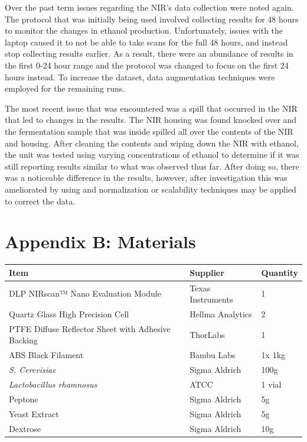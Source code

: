 \documentclass[12pt]{report}
\newcommand{\addappendix}[2]{
    \chapter*{Appendix #1: #2}
    \addcontentsline{toc}{section}{Appendix #1: #2}
}
\begin{document}
Over the past term issues regarding the NIR’s data collection were noted again. The protocol that was initially being used involved collecting results for 48 hours to monitor the changes in ethanol production. Unfortunately, issues with the laptop caused it to not be able to take scans for the full 48 hours, and instead stop collecting results earlier. As a result, there were an abundance of results in the first 0-24 hour range and the protocol was changed to focus on the first 24 hours instead. To increase the dataset, data augmentation techniques were employed for the remaining runs. 

The most recent issue that was encountered was a spill that occurred in the NIR that led to changes in the results. The NIR housing was found knocked over and the fermentation sample that was inside spilled all over the contents of the NIR and housing. After cleaning the contents and wiping down the NIR with ethanol, the unit was tested using varying concentrations of ethanol to determine if it was still reporting results similar to what was observed thus far. After doing so, there was a noticeable difference in the results, however, after investigation this was ameliorated by using and normalization or scalability techniques may be applied to correct the data. 

\addappendix{B}{Materials}

\begin{table}[H]
    \centering
    \begin{tabular}{l l l}
    \toprule
    Item & Supplier & Quantity\\
    \midrule
    DLP NIRscan™ Nano Evaluation Module & Texas Instruments & 1 \\
    Quartz Glass High Precision Cell & Hellma Analytics & 2 \\
    PTFE Diffuse Reflector Sheet with Adhesive Backing & ThorLabs & 1 \\
    ABS Black Filament & Bambu Labs & 1x 1kg \\
    \textit{S. Cerevisiae} & Sigma Aldrich & 100g \\
    \textit{Lactobacillus rhamnosus} & ATCC & 1 vial \\
    Peptone & Sigma Aldrich & 5g \\
    Yeast Extract & Sigma Aldrich & 5g \\
    Dextrose & Sigma Aldrich & 10g \\
    \bottomrule
    \end{tabular}
    \label{tab:matinfo}
    \end{table}
\end{document}
